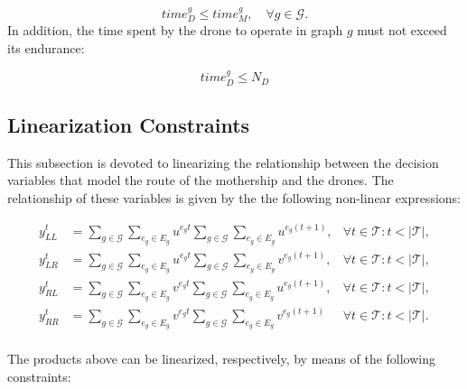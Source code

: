 \documentclass[10pt,a4paper]{elsarticle}
\newcommand{\EN}[1]{{\color{black}#1}}
\begin{document}
\begin{equation}\label{eq:DCW-Overlapping}\tag{DCW-PO}
time_D^g \leq time_M^g,\quad\forall g\in\mathcal G.
\end{equation}
\noindent
In addition, the time spent by the drone to operate in graph $g$ must not exceed its endurance:

\begin{equation}\label{eq:Endurance-Overlapping}\tag{Endurance-PO}
time_D^g \leq N_D
\end{equation}



\subsection*{Linearization Constraints}
\noindent
This subsection is devoted to lineariz\EN{ing} the relationship between the decision variables that model the route of the mothership and the drones. The relationship of these variables is given by the the following non-linear expressions:

\begin{align*}
y_{LL}^t & = \sum_{g\in\mathcal G}\sum_{e_g\in E_g} u^{e_gt} \sum_{g\in\mathcal G}\sum_{e_g\in E_g} u^{e_g(t+1)}, &\forall t\in\mathcal T:t<|\mathcal T|,\\
y_{LR}^t & = \sum_{g\in\mathcal G}\sum_{e_g\in E_g} u^{e_gt} \sum_{g\in\mathcal G}\sum_{e_g\in E_g} v^{e_g(t+1)}, &\forall t\in\mathcal T:t<|\mathcal T|,\\
y_{RL}^t & = \sum_{g\in\mathcal G}\sum_{e_g\in E_g} v^{e_gt} \sum_{g\in\mathcal G}\sum_{e_g\in E_g} u^{e_g(t+1)}, &\forall t\in\mathcal T:t<|\mathcal T|,\\
y_{RR}^t & = \sum_{g\in\mathcal G}\sum_{e_g\in E_g} v^{e_gt} \sum_{g\in\mathcal G}\sum_{e_g\in E_g} v^{e_g(t+1)} &\forall t\in\mathcal T:t<|\mathcal T|.\\
\end{align*}


\noindent
\EN{The products above} can be linearized, respectively, by means of the following constraints:
\end{document}
